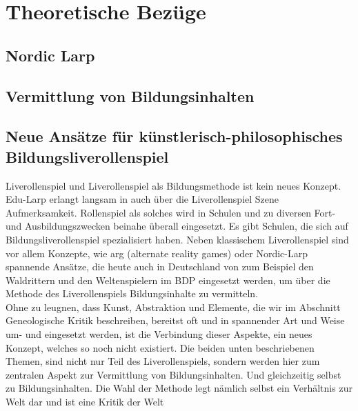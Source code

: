 \documentclass[12pt, a4paper, openany]{report}
\begin{document}
\chapter{Theoretische Bezüge}
\section{Nordic Larp} \label{nordic-larp}
\section{Vermittlung von Bildungsinhalten}

\section{Neue Ansätze für künstlerisch-philosophisches Bildungsliverollenspiel}
Liverollenspiel und Liverollenspiel als Bildungsmethode ist kein neues Konzept. 
Edu-Larp erlangt langsam in auch über die Liverollenspiel Szene Aufmerksamkeit. 
Rollenspiel als solches wird in Schulen und zu diversen Fort- und Ausbildungszwecken beinahe überall eingesetzt. 
Es gibt Schulen, die sich auf Bildungsliverollenspiel spezialisiert haben.
Neben klassischem Liverollenspiel sind vor allem Konzepte, wie arg (alternate reality games) oder Nordic-Larp spannende Ansätze, die heute auch in Deutschland von zum Beispiel den Waldrittern und den Weltenspielern im BDP eingesetzt werden, um über die Methode des Liverollenspiels Bildungsinhalte zu vermitteln. \\
Ohne zu leugnen, dass Kunst, Abstraktion und Elemente, die wir im Abschnitt \glqq Geneologische Kritik\grqq{} beschreiben, bereitst oft und in spannender Art und Weise um- und eingesetzt werden, ist die Verbindung dieser Aspekte, ein neues Konzept, welches so noch nicht existiert.
Die beiden unten beschriebenen Themen, sind nicht nur Teil des Liverollenspiels, sondern werden hier zum zentralen Aspekt zur Vermittlung von Bildungsinhalten.
Und gleichzeitig selbst zu Bildungsinhalten. 
Die Wahl der Methode legt nämlich selbst ein Verhältnis zur Welt dar und ist eine Kritik der Welt 
\end{document}
